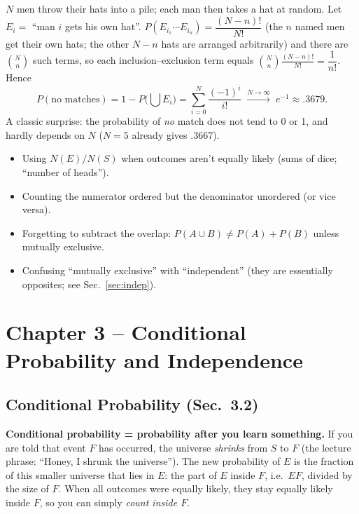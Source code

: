 \documentclass[11pt]{article}
\let\oldsubsection\subsection
\renewcommand{\subsection}{\Needspace{14\baselineskip}\oldsubsection}
\begin{document}
\begin{exbox}
$N$ men throw their hats into a pile; each man then takes a hat at random. Let $E_i=$ ``man $i$ gets his own hat''. $P(E_{i_1}\cdots E_{i_n})=\dfrac{(N-n)!}{N!}$ (the $n$ named men get their own hats; the other $N-n$ hats are arranged arbitrarily) and there are $\binom Nn$ such terms, so each inclusion--exclusion term equals $\binom Nn\frac{(N-n)!}{N!}=\dfrac1{n!}$. Hence
\[ P(\text{no matches})=1-P\Big(\bigcup E_i\Big)=\sum_{i=0}^N\frac{(-1)^i}{i!}\;\xrightarrow{N\to\infty}\;e^{-1}\approx.3679. \]
A classic surprise: the probability of \emph{no} match does not tend to 0 or 1, and hardly depends on $N$ ($N=5$ already gives $.3667$).
\end{exbox}

\begin{warnbox}
\begin{itemize}
\item Using $N(E)/N(S)$ when outcomes aren't equally likely (sums of dice; ``number of heads'').
\item Counting the numerator ordered but the denominator unordered (or vice versa).
\item Forgetting to subtract the overlap: $P(A\cup B)\ne P(A)+P(B)$ unless mutually exclusive.
\item Confusing ``mutually exclusive'' with ``independent'' (they are essentially opposites; see Sec.~\ref{sec:indep}).
\end{itemize}
\end{warnbox}

\clearpage
\section{Chapter 3 -- Conditional Probability and Independence}\label{sec:ch3}

\subsection{Conditional Probability (Sec.\ 3.2)}

\begin{ideabox}
\textbf{Conditional probability = probability after you learn something.} If you are told that event $F$ has occurred, the universe \emph{shrinks} from $S$ to $F$ (the lecture phrase: ``Honey, I shrunk the universe''). The new probability of $E$ is the fraction of this smaller universe that lies in $E$: the part of $E$ inside $F$, i.e.\ $EF$, divided by the size of $F$. When all outcomes were equally likely, they stay equally likely inside $F$, so you can simply \emph{count inside $F$}.
\end{ideabox}
\end{document}
